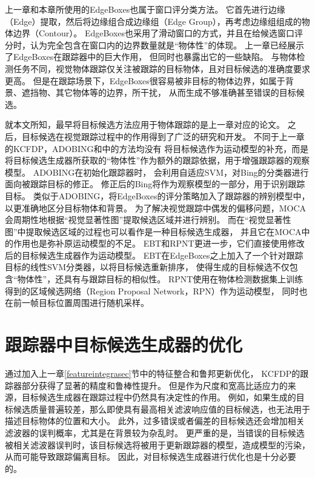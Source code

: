 上一章和本章所使用的EdgeBoxes也属于窗口评分类方法。
它首先进行边缘（Edge）提取，然后将边缘组合成边缘组（Edge Group），再考虑边缘组组成的物体边界（Contour）。
EdgeBoxes也采用了滑动窗口的方式，并且在给候选窗口评分时，认为完全包含在窗口内的边界数量就是``物体性''的体现。
上一章已经展示了EdgeBoxes在跟踪器中的巨大作用，
但同时也暴露出它的一些缺陷。
与物体检测任务不同，视觉物体跟踪仅关注被跟踪的目标物体，且对目标候选的准确度要求更高。
但是在跟踪场景下，EdgeBoxes很容易被非目标的物体边界，如属于背景、遮挡物、其它物体等的边界，所干扰，
从而生成不够准确甚至错误的目标候选。

就本文所知，最早将目标候选方法应用于物体跟踪的是上一章对应的论文。
之后，目标候选在视觉跟踪过程中的作用得到了广泛的研究和开发\citep{proposalSelect, adobing, ebt, rpnt, moca}。
不同于上一章的KCFDP，ADOBING和\cite{proposalSelect}中的方法均没有
将目标候选作为运动模型的补充，而是将目标候选生成器所获取的``物体性''作为额外的跟踪依据，用于增强跟踪器的观察模型。
ADOBING在初始化跟踪器时，
会利用自适应SVM，对Bing的分类器进行面向被跟踪目标的修正。
修正后的Bing将作为观察模型的一部分，用于识别跟踪目标。
类似于ADOBING，\cite{proposalSelect}将EdgeBoxes的评分策略加入了跟踪器的辨别模型中，以更准确地区分目标物体和背景。
为了解决视觉跟踪中偶发的偏移问题，MOCA会周期性地根据``视觉显著性图''提取候选区域并进行辨别。
而在``视觉显著性图''中提取候选区域的过程也可以看作是一种目标候选生成器，
并且它在MOCA中的作用也是弥补原运动模型的不足。
EBT和RPNT更进一步，它们直接使用修改后的目标候选生成器作为运动模型。
EBT在EdgeBoxes之上加入了一个针对跟踪目标的线性SVM分类器，以将目标候选重新排序，
使得生成的目标候选不仅包含``物体性''，还具有与跟踪目标的相似性。
RPNT使用在物体检测数据集上训练得到的区域候选网络（Region Proposal Network，RPN）作为运动模型，
同时也在前一帧目标位置周围进行随机采样。


\section{跟踪器中目标候选生成器的优化}
通过加入上一章\ref{featureintegrasec}节中的特征整合和鲁邦更新优化，
KCFDP的跟踪器部分获得了显著的精度和鲁棒性提升。
但是作为尺度和宽高比适应力的来源，目标候选生成器在跟踪过程中仍然具有决定性的作用。
例如，如果生成的目标候选质量普遍较差，那么即使具有最高相关滤波响应值的目标候选，也无法用于描述目标物体的位置和大小。
此外，过多错误或者偏差的目标候选还会增加相关滤波器的误判概率，尤其是在背景较为杂乱时。
更严重的是，当错误的目标候选被相关滤波器误判时，该目标候选将被用于更新跟踪器的模型，造成模型的污染，
从而可能导致跟踪偏离目标。
因此，对目标候选生成器进行优化也是十分必要的。

